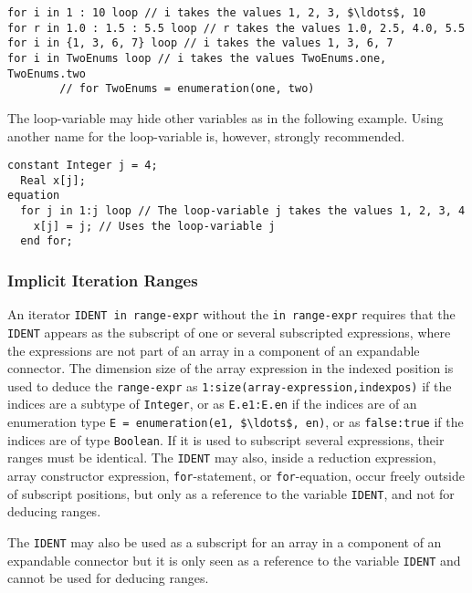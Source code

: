 \begin{example}
\begin{lstlisting}[language=modelica]
for i in 1 : 10 loop // i takes the values 1, 2, 3, $\ldots$, 10
for r in 1.0 : 1.5 : 5.5 loop // r takes the values 1.0, 2.5, 4.0, 5.5
for i in {1, 3, 6, 7} loop // i takes the values 1, 3, 6, 7
for i in TwoEnums loop // i takes the values TwoEnums.one, TwoEnums.two
        // for TwoEnums = enumeration(one, two)
\end{lstlisting}
The loop-variable may hide other variables as in the following example.  Using another name for the loop-variable is, however, strongly recommended.
\begin{lstlisting}[language=modelica]
  constant Integer j = 4;
  Real x[j];
equation
  for j in 1:j loop // The loop-variable j takes the values 1, 2, 3, 4
    x[j] = j; // Uses the loop-variable j
  end for;
\end{lstlisting}
\end{example}

\subsubsection{Implicit Iteration Ranges}\label{implicit-iteration-ranges}

An iterator \lstinline!IDENT in range-expr! without the \lstinline!in range-expr! requires that the \lstinline!IDENT! appears as the subscript of one or several subscripted expressions, where the expressions are not part of an array in a component of an expandable connector.
The dimension size of the array expression in the indexed position is used to deduce the \lstinline!range-expr! as \lstinline!1:size(array-expression,indexpos)! if the indices are a subtype of \lstinline!Integer!, or as \lstinline!E.e1:E.en! if the indices are of an enumeration type \lstinline!E = enumeration(e1, $\ldots$, en)!, or as \lstinline!false:true! if the indices are of type \lstinline!Boolean!.
If it is used to subscript several expressions, their ranges must be identical.
The \lstinline!IDENT! may also, inside a reduction expression, array constructor expression, \lstinline!for!-statement, or \lstinline!for!-equation, occur freely outside of subscript positions, but only as a reference to the variable \lstinline!IDENT!, and not for deducing ranges.

The \lstinline!IDENT! may also be used as a subscript for an array in a component of an expandable connector
but it is only seen as a reference to the variable \lstinline!IDENT! and cannot be used for deducing ranges.

